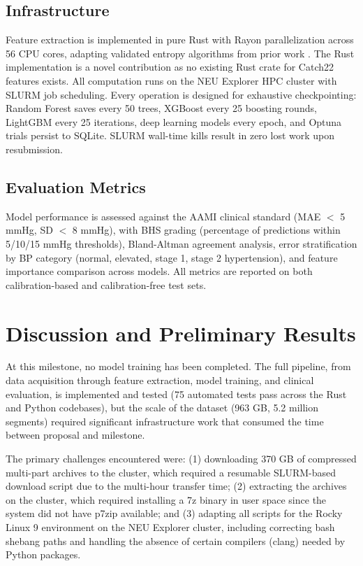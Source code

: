 \documentclass[11pt]{article}
\begin{document}
\subsection{Infrastructure}

Feature extraction is implemented in pure Rust with Rayon parallelization across 56 CPU cores, adapting validated entropy algorithms from prior work \citep{boda2025ai4pain}. The Rust implementation is a novel contribution as no existing Rust crate for Catch22 features exists. All computation runs on the NEU Explorer HPC cluster with SLURM job scheduling. Every operation is designed for exhaustive checkpointing: Random Forest saves every 50 trees, XGBoost every 25 boosting rounds, LightGBM every 25 iterations, deep learning models every epoch, and Optuna trials persist to SQLite. SLURM wall-time kills result in zero lost work upon resubmission.

\subsection{Evaluation Metrics}

Model performance is assessed against the AAMI clinical standard (MAE $<$ 5 mmHg, SD $<$ 8 mmHg), with BHS grading (percentage of predictions within 5/10/15 mmHg thresholds), Bland-Altman agreement analysis, error stratification by BP category (normal, elevated, stage 1, stage 2 hypertension), and feature importance comparison across models. All metrics are reported on both calibration-based and calibration-free test sets.

\section{Discussion and Preliminary Results}

At this milestone, no model training has been completed. The full pipeline, from data acquisition through feature extraction, model training, and clinical evaluation, is implemented and tested (75 automated tests pass across the Rust and Python codebases), but the scale of the dataset (963 GB, 5.2 million segments) required significant infrastructure work that consumed the time between proposal and milestone.

The primary challenges encountered were: (1) downloading 370 GB of compressed multi-part archives to the cluster, which required a resumable SLURM-based download script due to the multi-hour transfer time; (2) extracting the archives on the cluster, which required installing a 7z binary in user space since the system did not have p7zip available; and (3) adapting all scripts for the Rocky Linux 9 environment on the NEU Explorer cluster, including correcting bash shebang paths and handling the absence of certain compilers (clang) needed by Python packages.
\end{document}
